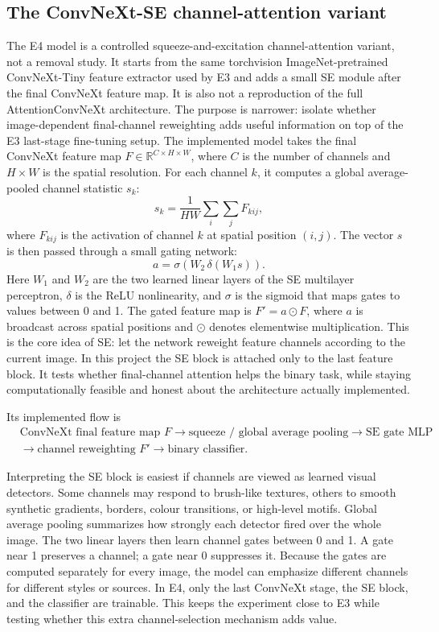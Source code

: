 \documentclass[11pt,a4paper]{article}
\begin{document}
\subsection{The ConvNeXt-SE channel-attention variant}

The E4 model is a controlled squeeze-and-excitation channel-attention variant,
not a removal study. It starts from the same torchvision ImageNet-pretrained
ConvNeXt-Tiny feature extractor used by E3 and adds a small SE module after the
final ConvNeXt feature map. It is also not a reproduction of the full
AttentionConvNeXt architecture. The purpose is narrower: isolate whether
image-dependent final-channel reweighting adds useful information on top of
the E3 last-stage fine-tuning setup. The implemented model takes the final
ConvNeXt feature map
\(F\in\mathbb{R}^{C\times H\times W}\), where \(C\) is the number of channels
and \(H\times W\) is the spatial resolution. For each channel \(k\), it
computes a global average-pooled channel statistic \(s_k\):
\[
  s_k = \frac{1}{HW}\sum_i\sum_j F_{kij},
\]
where \(F_{kij}\) is the activation of channel \(k\) at spatial position
\((i,j)\). The vector \(s\) is then passed through a small gating network:
\[
  a = \sigma\!\left(W_2\,\delta(W_1s)\right).
\]
Here \(W_1\) and \(W_2\) are the two learned linear layers of the SE multilayer
perceptron, \(\delta\) is the ReLU nonlinearity, and \(\sigma\) is the sigmoid
that maps gates to values between 0 and 1. The gated feature map is
\(F' = a\odot F\), where \(a\) is broadcast across spatial positions and
\(\odot\) denotes elementwise multiplication. This is the core idea of SE:
let the network reweight feature channels according to the current image. In
this project the SE block is attached only to the last feature block. It tests
whether final-channel attention helps the binary task, while staying
computationally feasible and honest about the architecture actually
implemented.

Its implemented flow is
\[
  \begin{aligned}
  &\text{ConvNeXt final feature map } F
  \rightarrow
  \text{squeeze / global average pooling}
  \rightarrow
  \text{SE gate MLP} \\
  &\rightarrow
  \text{channel reweighting } F'
  \rightarrow
  \text{binary classifier}.
  \end{aligned}
\]

Interpreting the SE block is easiest if channels are viewed as learned visual
detectors. Some channels may respond to brush-like textures, others to smooth
synthetic gradients, borders, colour transitions, or high-level motifs. Global
average pooling summarizes how strongly each detector fired over the whole
image. The two linear layers then learn channel gates between 0 and 1. A gate
near 1 preserves a channel; a gate near 0 suppresses it. Because the gates are
computed separately for every image, the model can emphasize different
channels for different styles or sources. In E4, only the last ConvNeXt stage,
the SE block, and the classifier are trainable. This keeps the experiment
close to E3 while testing whether this extra channel-selection mechanism adds
value.
\end{document}
